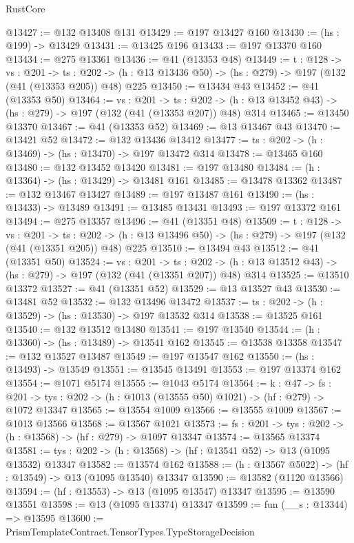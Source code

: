 \begin{lexlean}{RustCore}
\begin{coremodule}
@13427 := @132 @13408 @131
@13429 := @197 @13427 @160
@13430 := (hs : @199) -> @13429
@13431 := @13425 @196
@13433 := @197 @13370 @160
@13434 := @275 @13361
@13436 := @41 (@13353 @48)
@13449 := {t : @128} ->
  {vs : @201} ->
  {ts : @202} -> (h : @13 @13436 @50) -> (hs : @279) -> @197 (@132 (@41 (@13353 @205)) @48) @225
@13450 := @13434 @43
@13452 := @41 (@13353 @50)
@13464 := {vs : @201} ->
  {ts : @202} -> (h : @13 @13452 @43) -> (hs : @279) -> @197 (@132 (@41 (@13353 @207)) @48) @314
@13465 := @13450 @13370
@13467 := @41 (@13353 @52)
@13469 := @13 @13467 @43
@13470 := @13421 @52
@13472 := @132 @13436 @13412
@13477 := {ts : @202} -> (h : @13469) -> (hs : @13470) -> @197 @13472 @314
@13478 := @13465 @160
@13480 := @132 @13452 @13420
@13481 := @197 @13480
@13484 := (h : @13364) -> (hs : @13429) -> @13481 @161
@13485 := @13478 @13362
@13487 := @132 @13467 @13427
@13489 := @197 @13487 @161
@13490 := (hs : @13433) -> @13489
@13491 := @13485 @13431
@13493 := @197 @13372 @161
@13494 := @275 @13357
@13496 := @41 (@13351 @48)
@13509 := {t : @128} ->
  {vs : @201} ->
  {ts : @202} -> (h : @13 @13496 @50) -> (hs : @279) -> @197 (@132 (@41 (@13351 @205)) @48) @225
@13510 := @13494 @43
@13512 := @41 (@13351 @50)
@13524 := {vs : @201} ->
  {ts : @202} -> (h : @13 @13512 @43) -> (hs : @279) -> @197 (@132 (@41 (@13351 @207)) @48) @314
@13525 := @13510 @13372
@13527 := @41 (@13351 @52)
@13529 := @13 @13527 @43
@13530 := @13481 @52
@13532 := @132 @13496 @13472
@13537 := {ts : @202} -> (h : @13529) -> (hs : @13530) -> @197 @13532 @314
@13538 := @13525 @161
@13540 := @132 @13512 @13480
@13541 := @197 @13540
@13544 := (h : @13360) -> (hs : @13489) -> @13541 @162
@13545 := @13538 @13358
@13547 := @132 @13527 @13487
@13549 := @197 @13547 @162
@13550 := (hs : @13493) -> @13549
@13551 := @13545 @13491
@13553 := @197 @13374 @162
@13554 := @1071 @5174
@13555 := @1043 @5174
@13564 := {k : @47} ->
  {fs : @201} -> {tys : @202} -> (h : @1013 (@13555 @50) @1021) -> (hf : @279) -> @1072 @13347
@13565 := @13554 @1009
@13566 := @13555 @1009
@13567 := @1013 @13566
@13568 := @13567 @1021
@13573 := {fs : @201} -> {tys : @202} -> (h : @13568) -> (hf : @279) -> @1097 @13347
@13574 := @13565 @13374
@13581 := {tys : @202} -> (h : @13568) -> (hf : @13541 @52) -> @13 (@1095 @13532) @13347
@13582 := @13574 @162
@13588 := (h : @13567 @5022) -> (hf : @13549) -> @13 (@1095 @13540) @13347
@13590 := @13582 (@1120 @13566)
@13594 := (hf : @13553) -> @13 (@1095 @13547) @13347
@13595 := @13590 @13551
@13598 := @13 (@1095 @13374) @13347
@13599 := fun (__s : @13344) => @13595
@13600 := PrismTemplateContract.TensorTypes.TypeStorageDecision

\end{coremodule}
\end{lexlean}
